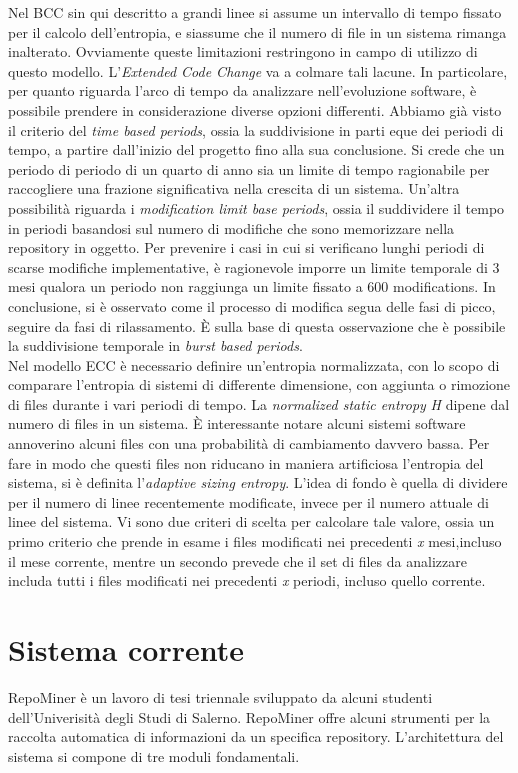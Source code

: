 Nel BCC sin qui descritto a grandi linee si assume un intervallo di tempo fissato per il calcolo dell'entropia, e siassume che il numero di file in un sistema rimanga inalterato. Ovviamente queste limitazioni restringono in campo di utilizzo di questo modello. L'\textit{Extended Code Change} va a colmare tali lacune. In particolare, per quanto riguarda l'arco di tempo da analizzare nell'evoluzione software, è possibile prendere in considerazione diverse opzioni differenti. Abbiamo già visto il criterio del \textit{time based periods}, ossia la suddivisione in parti eque dei periodi di tempo, a partire dall'inizio del progetto fino alla sua conclusione. Si crede che un periodo di periodo di un quarto di anno sia un limite di tempo ragionabile per raccogliere una frazione significativa nella crescita di un sistema. Un'altra possibilità riguarda i \textit{modification limit base periods}, ossia il suddividere il tempo in periodi basandosi sul numero di modifiche che sono memorizzare nella repository in oggetto. Per prevenire i casi in cui si verificano lunghi periodi di scarse modifiche implementative, è ragionevole imporre un limite temporale di 3 mesi qualora un periodo non raggiunga un limite fissato a 600 modifications. In conclusione, si è osservato come il processo di modifica segua delle fasi di picco, seguire da fasi di rilassamento. È sulla base di questa osservazione che è possibile la suddivisione temporale in \textit{burst based periods}.\\

Nel modello ECC è necessario definire un'entropia normalizzata, con lo scopo di comparare l'entropia di sistemi di differente dimensione, con aggiunta o rimozione di files durante i vari periodi di tempo. La \textit{normalized static entropy} \textit{H} dipene dal numero di files in un sistema. È interessante notare alcuni sistemi software annoverino alcuni files con una probabilità di cambiamento davvero bassa. Per fare in modo che questi files non riducano in maniera artificiosa l'entropia del sistema, si è definita l'\textit{adaptive sizing entropy}. L'idea di fondo è quella di dividere per il numero di linee recentemente modificate, invece per il numero attuale di linee del sistema. Vi sono due criteri di scelta per calcolare tale valore, ossia un primo criterio che prende in esame i files modificati nei precedenti \textit{x} mesi,incluso il mese corrente, mentre un secondo prevede che il set di files da analizzare includa tutti i files modificati nei precedenti \textit{x} periodi, incluso quello corrente. 
\section{Sistema corrente}
RepoMiner è un lavoro di tesi triennale sviluppato da alcuni studenti dell'Univerisità degli Studi di Salerno. RepoMiner offre alcuni strumenti per la raccolta automatica di informazioni da un specifica repository. L'architettura del sistema si compone di tre moduli fondamentali. \\

